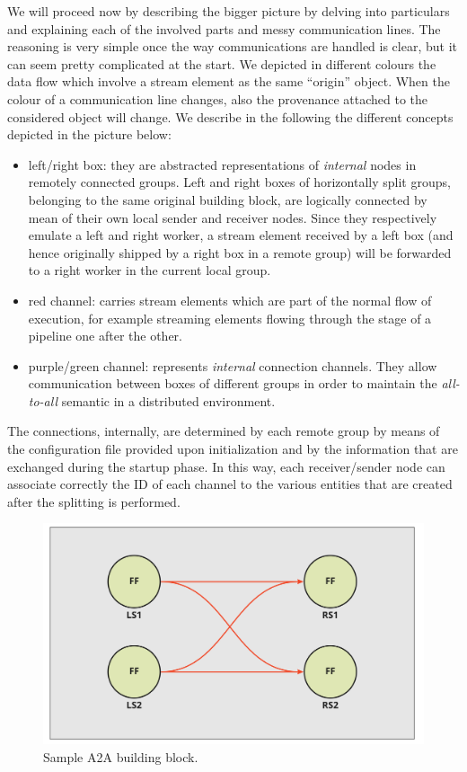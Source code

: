 We will proceed now by describing the bigger picture by delving into particulars and explaining each of the involved parts and messy communication lines. The reasoning is very simple once the way communications are handled is clear, but it can seem pretty complicated at the start. We depicted in different colours the data flow which involve a stream element as the same ``origin'' object. When the colour of a communication line changes, also the provenance attached to the considered object will change. We describe in the following the different concepts depicted in the picture below:
\begin{itemize}
	\item left/right box: they are abstracted representations of \textit{internal} nodes in remotely connected groups. Left and right boxes of horizontally split groups, belonging to the same original building block, are logically connected by mean of their own local sender and receiver nodes. Since they respectively emulate a left and right worker, a stream element received by a left box (and hence originally shipped by a right box in a remote group) will be forwarded to a right worker in the current local group.
	\item red channel: carries stream elements which are part of the normal flow of execution, for example streaming elements flowing through the stage of a pipeline one after the other.
	\item purple/green channel: represents \textit{internal} connection channels.  They allow communication between boxes of different groups in order to maintain the \textit{all-to-all} semantic in a distributed environment.
\end{itemize}

The connections, internally, are determined by each remote group by means of the configuration file provided upon initialization and by the information that are exchanged during the startup phase. In this way, each receiver/sender node can associate correctly the ID of each channel to the various entities that are created after the splitting is performed.

\begin{figure}[H]
	\centering
	\includegraphics[width=0.5\linewidth]{res/original-a2a.jpg}
	\caption{Sample A2A building block.}
	\label{fig:original-a2a}
\end{figure}

